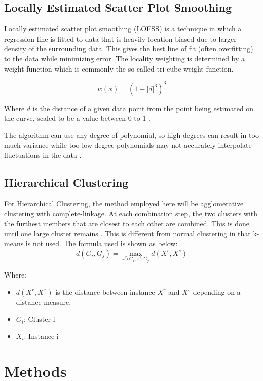 \documentclass[conference]{IEEEtran}
\begin{document}
\subsection{Locally Estimated Scatter Plot Smoothing}

Locally estimated scatter plot smoothing (LOESS) is a technique in which a regression line is fitted to data that is heavily location biased due to larger density of the surrounding data. This gives the best line of fit (often overfitting) to the data while minimizing error. The locality weighting is determined by a weight function which is commonly the so-called tri-cube weight function.

\begin{equation}
w(x) = (1 - |d|^3)^3 
\end{equation}

Where $d$ is the distance of a given data point from the point being estimated on the curve, scaled to be a value between 0 to 1 \cite{b8}.

The algorithm can use any degree of polynomial, so high degrees can result in too much variance while too low degree polynomials may not accurately interpolate fluctuations in the data \cite{b7}. 

\subsection{Hierarchical Clustering}

For Hierarchical Clustering, the method employed here will be agglomerative clustering with complete-linkage. At each combination step, the two clusters with the furthest members that are closest to each other are combined. This is done until one large cluster remains \cite{b2}. This is different from normal clustering in that k-means is not used. The formula used is shown as below:
\begin{equation}
d(G_i, G_j) = \max_{x^r \epsilon G_i , x^s \epsilon G_j} d(X^r, X^s)
\end{equation}

Where:
\begin{itemize}
\item $d(X^r, X^x)$ is the distance between instance $X^r$ and $X^s$ depending on a distance measure.
\item $G_i$: Cluster i
\item $X_i$: Instance i
\end{itemize}


\section{Methods}
\end{document}
